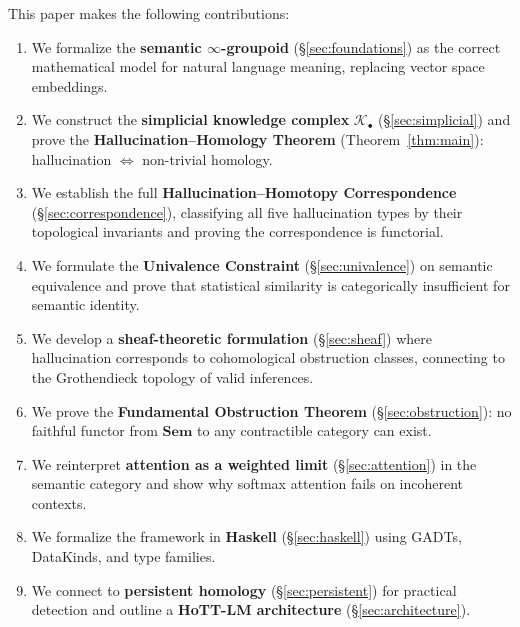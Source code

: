 \documentclass[11pt,a4paper]{article}
\theoremstyle{plain}
\theoremstyle{definition}
\newcommand{\Sem}{\mathbf{Sem}}
\begin{document}
This paper makes the following contributions:

\begin{enumerate}[leftmargin=*,nosep]
  \item We formalize the \textbf{semantic $\infty$-groupoid} (\S\ref{sec:foundations}) as the correct mathematical model for natural language meaning, replacing vector space embeddings.
  
  \item We construct the \textbf{simplicial knowledge complex} $\mathcal{K}_\bullet$ (\S\ref{sec:simplicial}) and prove the \textbf{Hallucination--Homology Theorem} (Theorem~\ref{thm:main}): hallucination $\iff$ non-trivial homology.
  
  \item We establish the full \textbf{Hallucination--Homotopy Correspondence} (\S\ref{sec:correspondence}), classifying all five hallucination types by their topological invariants and proving the correspondence is functorial.
  
  \item We formulate the \textbf{Univalence Constraint} (\S\ref{sec:univalence}) on semantic equivalence and prove that statistical similarity is categorically insufficient for semantic identity.
  
  \item We develop a \textbf{sheaf-theoretic formulation} (\S\ref{sec:sheaf}) where hallucination corresponds to cohomological obstruction classes, connecting to the Grothendieck topology of valid inferences.
  
  \item We prove the \textbf{Fundamental Obstruction Theorem} (\S\ref{sec:obstruction}): no faithful functor from $\Sem$ to any contractible category can exist.
  
  \item We reinterpret \textbf{attention as a weighted limit} (\S\ref{sec:attention}) in the semantic category and show why softmax attention fails on incoherent contexts.
  
  \item We formalize the framework in \textbf{Haskell} (\S\ref{sec:haskell}) using GADTs, DataKinds, and type families.
  
  \item We connect to \textbf{persistent homology} (\S\ref{sec:persistent}) for practical detection and outline a \textbf{HoTT-LM architecture} (\S\ref{sec:architecture}).
\end{enumerate}
\end{document}
